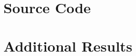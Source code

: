 \documentclass[10pt, a4paper]{report}
\renewcommand{\footnotesize}{\fontsize{8}{9}\selectfont}
\begin{document}
\clearpage
{\footnotesize


}

\appendix

\chapter{Source Code}

\chapter{Additional Results}
\end{document}
